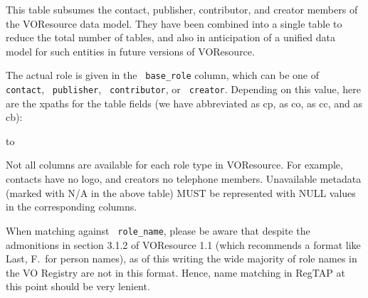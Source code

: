 \documentclass[11pt,a4paper]{ivoa}
\newcommand{\rtent}[1]{\texttt{\color{rtcolor} #1}}
\begin{document}
\label{table_res_role}

This table subsumes the contact, publisher, contributor, 
and creator members of the
VOResource data model.  They have been combined into a single table to
reduce the total number of tables, and also in anticipation of a unified
data model for such entities in future versions of VOResource.

The actual role is given in the \rtent{base\_role} column, which
can be one of \rtent{contact}, \rtent{publisher}, \rtent{contributor}, or
\rtent{creator}.  Depending on this value, here are the xpaths
for the table fields (we have abbreviated
as cp,  as co,  
as cc,
and  as cb):

\vspace{5pt}
\hbox to
\vskip5pt

Not all columns are available for each role type in VOResource.  For
example, contacts have no logo, and creators no telephone members.  Unavailable
metadata (marked with N/A in the above table) MUST be represented with NULL
values in the corresponding columns.

When matching against \rtent{role\_name}, please be aware that despite
the admonitions in section 3.1.2 of VOResource 1.1 (which recommends a
format like Last, F.~for person names), as of this writing the wide
majority of role names in the VO Registry are not in this format.  Hence, name
matching in RegTAP at this point should be very lenient.


\end{document}
